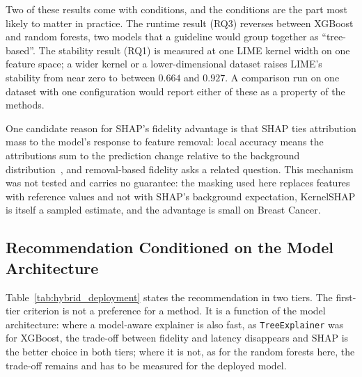 \documentclass{cleiej}
\begin{document}
Two of these results come with conditions, and the conditions are the part
most likely to matter in practice. The runtime result (RQ3) reverses
between XGBoost and random forests, two models that a guideline would group
together as ``tree-based''. The stability result (RQ1) is measured at one
LIME kernel width on one feature space; a wider kernel or a
lower-dimensional dataset raises LIME's stability from near zero to between
$0.664$ and $0.927$. A comparison run on one dataset with one
configuration would report either of these as a property of the methods.

One candidate reason for SHAP's fidelity advantage is that SHAP ties
attribution mass to the model's response to feature removal: local accuracy
means the attributions sum to the prediction change relative to the
background distribution~\cite{lundberg2017unified}, and removal-based
fidelity asks a related question. This mechanism was not tested and carries
no guarantee: the masking used here replaces features with reference values
and not with SHAP's background expectation, KernelSHAP is itself a sampled
estimate, and the advantage is small on Breast Cancer.

\subsection{Recommendation Conditioned on the Model Architecture}
\label{sec:recommendations}

Table~\ref{tab:hybrid_deployment} states the recommendation in two tiers.
The first-tier criterion is not a preference for a method. It is a function
of the model architecture: where a model-aware explainer is also fast, as
\texttt{TreeExplainer} was for XGBoost, the trade-off between fidelity and
latency disappears and SHAP is the better choice in both tiers; where it is
not, as for the random forests here, the trade-off remains and has to be
measured for the deployed model.
\end{document}

